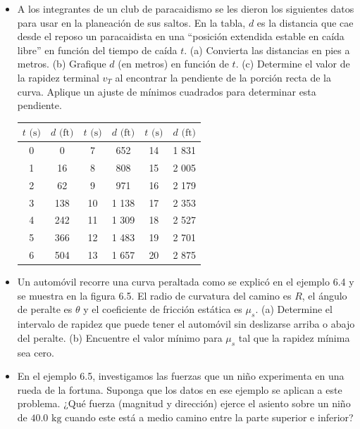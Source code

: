 \documentclass[11pt,a4paper]{article}
\begin{document}
\newpage

\begin{itemize}
    \item[\textbf{40.}] A los integrantes de un club de paracaidismo se les dieron los siguientes datos para usar en la planeación de sus saltos. En la tabla, $d$ es la distancia que cae desde el reposo un paracaidista en una ``posición extendida estable en caída libre'' en función del tiempo de caída $t$. (a) Convierta las distancias en pies a metros. (b) Grafique $d$ (en metros) en función de $t$. (c) Determine el valor de la rapidez terminal $v_T$ al encontrar la pendiente de la porción recta de la curva. Aplique un ajuste de mínimos cuadrados para determinar esta pendiente.

    \begin{center}
    \begin{tabular}{cc|cc|cc}
    \hline
    $t \text{ (s)}$ & $d \text{ (ft)}$ & $t \text{ (s)}$ & $d \text{ (ft)}$ & $t \text{ (s)}$ & $d \text{ (ft)}$ \\
    \hline
    0 & 0 & 7 & 652 & 14 & 1 831 \\
    1 & 16 & 8 & 808 & 15 & 2 005 \\
    2 & 62 & 9 & 971 & 16 & 2 179 \\
    3 & 138 & 10 & 1 138 & 17 & 2 353 \\
    4 & 242 & 11 & 1 309 & 18 & 2 527 \\
    5 & 366 & 12 & 1 483 & 19 & 2 701 \\
    6 & 504 & 13 & 1 657 & 20 & 2 875 \\
    \hline
    \end{tabular}
    \end{center}
    \vspace*{8cm}

    \item[\textbf{41.}] Un automóvil recorre una curva peraltada como se explicó en el ejemplo 6.4 y se muestra en la figura 6.5. El radio de curvatura del camino es $R$, el ángulo de peralte es $\theta$ y el coeficiente de fricción estática es $\mu_s$. (a) Determine el intervalo de rapidez que puede tener el automóvil sin deslizarse arriba o abajo del peralte. (b) Encuentre el valor mínimo para $\mu_s$ tal que la rapidez mínima sea cero.
    \vspace*{7cm}

    \item[\textbf{42.}] En el ejemplo 6.5, investigamos las fuerzas que un niño experimenta en una rueda de la fortuna. Suponga que los datos en ese ejemplo se aplican a este problema. ¿Qué fuerza (magnitud y dirección) ejerce el asiento sobre un niño de $40.0 \text{ kg}$ cuando este está a medio camino entre la parte superior e inferior?
    \vspace*{6cm}


\end{itemize}
\end{document}
